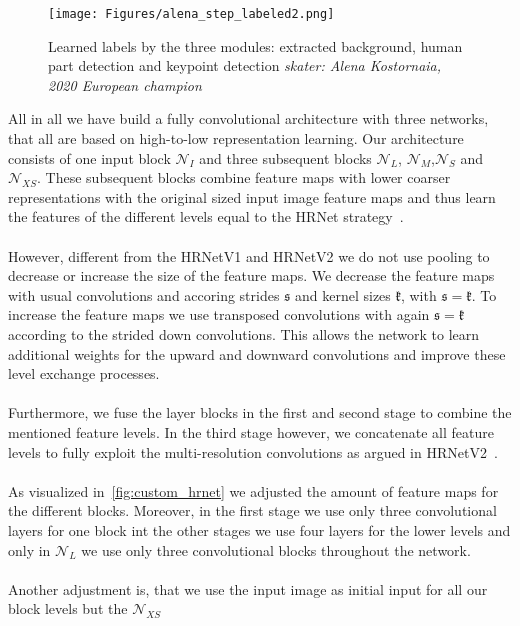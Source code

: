 \begin{figure}
    \centering
    \texttt{[image: Figures/alena\_step\_labeled2.png]}
    \decoRule
    \caption[Alena step]{Learned labels by the three modules: extracted background, human part detection and
    keypoint detection \textit{skater: Alena Kostornaia, 2020 European champion\cite{2020european}}}
    \label{fig:alena_step_labeled}
\end{figure}


All in all we have build a fully convolutional architecture with three networks, that all are based on high-to-low
representation learning. Our architecture consists of one input block $\mathcal{N}_I$  and three subsequent blocks
$\mathcal{N}_L$, $\mathcal{N}_M$,$\mathcal{N}_S$ and $\mathcal{N}_{XS}$.
These subsequent blocks combine feature maps with lower coarser representations with the original sized input image
feature maps and thus learn the features of the different levels equal to the HRNet strategy~\cite{HRNetv2, HRNetv1}.
\\\mbox{}\\
However, different from the HRNetV1 and HRNetV2 we do not use pooling to decrease or increase the size of the feature
maps. We decrease the feature maps with usual convolutions and accoring strides $\mathfrak{s}$ and kernel sizes
$\mathfrak{k}$, with $\mathfrak{s}=\mathfrak{k}$.
To increase the feature maps we use transposed convolutions with again $\mathfrak{s}=\mathfrak{k}$ according to the
strided down convolutions.
This allows the network to learn additional weights for the upward and downward convolutions and improve these level
exchange processes.
\\\mbox{}\\
Furthermore, we fuse the layer blocks in the first and second stage to combine the mentioned feature levels.
In the third stage however, we concatenate all feature levels to fully exploit the multi-resolution convolutions
as argued in HRNetV2~\cite{HRNetv2}.
\\\mbox{}\\
As visualized in~\ref{fig:custom_hrnet} we adjusted the amount of feature maps for the different blocks.
Moreover, in the first stage we use only three convolutional layers for one block int the other stages we use four layers
for the lower levels and only in $\mathcal{N}_L$ we use only three convolutional blocks throughout the network.
\\\mbox{}\\
Another adjustment is, that we use the input image as initial input for all our block levels but the $\mathcal{N}_{XS}$

